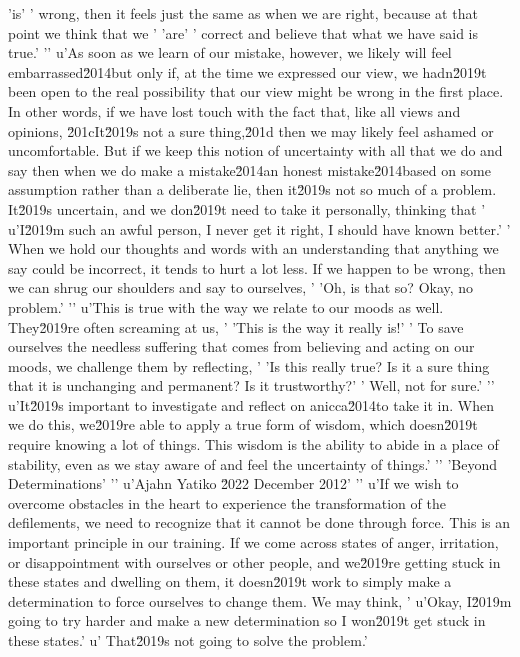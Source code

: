 'is'
' wrong, then it feels just the same as when we are right, because at that point we think that we '
'are'
' correct and believe that what we have said is true.'
'\n'
u'As soon as we learn of our mistake, however, we likely will feel embarrassed\u2014but only if, at the time we expressed our view, we hadn\u2019t been open to the real possibility that our view might be wrong in the first place. In other words, if we have lost touch with the fact that, like all views and opinions, \u201cIt\u2019s not a sure thing,\u201d then we may likely feel ashamed or uncomfortable. But if we keep this notion of uncertainty with all that we do and say then when we do make a mistake\u2014an honest mistake\u2014based on some assumption rather than a deliberate lie, then it\u2019s not so much of a problem. It\u2019s uncertain, and we don\u2019t need to take it personally, thinking that '
u'I\u2019m such an awful person, I never get it right, I should have known better.'
' When we hold our thoughts and words with an understanding that anything we say could be incorrect, it tends to hurt a lot less. If we happen to be wrong, then we can shrug our shoulders and say to ourselves, '
'Oh, is that so? Okay, no problem.'
'\n'
u'This is true with the way we relate to our moods as well. They\u2019re often screaming at us, '
'This is the way it really is!'
' To save ourselves the needless suffering that comes from believing and acting on our moods, we challenge them by reflecting, '
'Is this really true? Is it a sure thing that it is unchanging and permanent? Is it trustworthy?'
' Well, not for sure.'
'\n'
u'It\u2019s important to investigate and reflect on anicca\u2014to take it in. When we do this, we\u2019re able to apply a true form of wisdom, which doesn\u2019t require knowing a lot of things. This wisdom is the ability to abide in a place of stability, even as we stay aware of and feel the uncertainty of things.'
'\n'
'Beyond Determinations'
'\n'
u'Ajahn Yatiko \u2022 December 2012'
'\n'
u'If we wish to overcome obstacles in the heart to experience the transformation of the defilements, we need to recognize that it cannot be done through force. This is an important principle in our training. If we come across states of anger, irritation, or disappointment with ourselves or other people, and we\u2019re getting stuck in these states and dwelling on them, it doesn\u2019t work to simply make a determination to force ourselves to change them. We may think, '
u'Okay, I\u2019m going to try harder and make a new determination so I won\u2019t get stuck in these states.'
u' That\u2019s not going to solve the problem.'
